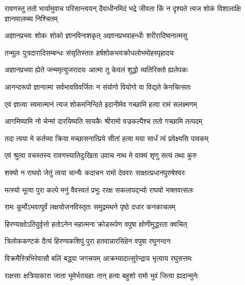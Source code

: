 


\addtocounter{shlokacount}{35}


\threelineshloka
{रावणस्तु ततो भार्यामुवाच परिसान्त्वयन्}
{दैवाधीनमिदं भद्रे जीवता किं न दृश्यते}
{त्यज शोकं विशालाक्षि ज्ञानमालम्ब्य निश्चितम्} %

\twolineshloka
{अज्ञानप्रभवः शोकः शोको ज्ञानविनाशकृत्}
{अज्ञानप्रभवाहन्धीः शरीरादिष्वनात्मसु} %

\twolineshloka
{तन्मूलः पुत्रदारादिसम्बन्धः संसृतिस्ततः}
{हर्षशोकभयक्रोधलोभमोहस्पृहादयः} %

\twolineshloka
{अज्ञानप्रभवा ह्येते जन्ममृत्युजरादयः}
{आत्मा तु केवलं शुद्धो व्यतिरिक्तो ह्यलेपकः} %

\twolineshloka
{आनन्दरूपो ज्ञानात्मा सर्वभावविवर्जितः}
{न संयोगो वियोगो वा विद्यते केनचित्सतः} %

\twolineshloka
{एवं ज्ञात्वा स्वमात्मानं त्यज शोकमनिन्दिते}
{इदानीमेव गच्छामि हत्वा रामं सलक्ष्मणम्} %

\twolineshloka
{आगमिष्यामि नो चेन्मां दारयिष्यति सायकैः}
{श्रीरामो वज्रकल्पैश्च ततो गच्छामि तत्पदम्} %

\twolineshloka
{तदा त्वया मे कर्तव्या क्रिया मच्छासनात्प्रिये}
{सीतां हत्वा मया सार्धं त्वं प्रवेक्ष्यसि पावकम्} %

\twolineshloka
{एवं श्रुत्वा वचस्तस्य रावणस्यातिदुःखिता}
{उवाच नाथ मे वाक्यं शृणु सत्यं तथा कुरु} %

\twolineshloka
{शक्यो न राघवो जेतुं त्वया चान्यैः कदाचन}
{रामो देववरः साक्षात्प्रधानपुरुषेश्वरः} %

\twolineshloka
{मत्स्यो भूत्वा पुरा कल्पे मनुं वैवस्वतं प्रभुः}
{ररक्ष सकलापद्भ्यो राघवो भक्तवत्सलः} %

\twolineshloka
{रामः कूर्मोऽभवत्पूर्वं लक्षयोजनविस्तृतः}
{समुद्रमथने पृष्ठे दधार कनकाचलम्} %

\twolineshloka
{हिरण्याक्षोऽतिदुर्वृत्तो हतोऽनेन महात्मना}
{क्रोडरूपेण वपुषा क्षोणीमुद्धरता क्वचित्} %

\twolineshloka
{त्रिलोककण्टकं दैत्यं हिरण्यकशिपुं पुरा}
{हतवान्नारसिंहेन वपुषा रघुनन्दनः} %

\twolineshloka
{विक्रमैस्त्रिभिरेवासौ बलिं बद्\mbox{}ध्वा जगत्त्रयम्}
{आक्रम्यादात्सुरेन्द्राय भृत्याय रघुसत्तमः} %

\twolineshloka
{राक्षसाः क्षत्रियाकारा जाता भूमेर्भरावहाः}
{तान् हत्वा बहुशो रामो भुवं जित्वा ह्यदान्मुनेः} %

